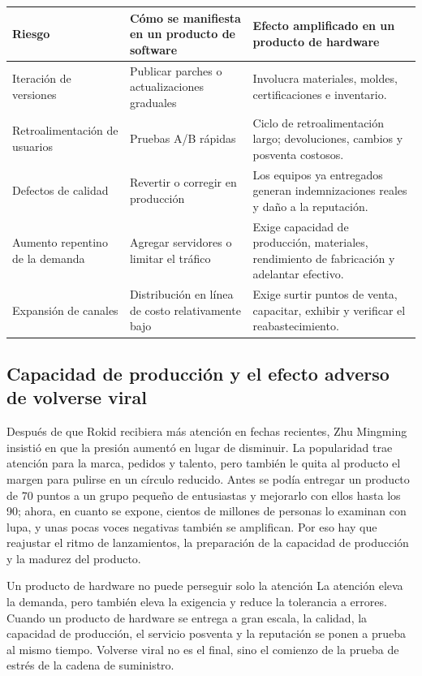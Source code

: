\documentclass[a4paper]{article}
\begin{document}
\noindent\begin{tabularx}{\textwidth}{p{}p{}X}
\toprule
Riesgo & Cómo se manifiesta en un producto de software & Efecto amplificado en un producto de hardware \\
\midrule
Iteración de versiones & Publicar parches o actualizaciones graduales & Involucra materiales, moldes, certificaciones e inventario. \\
Retroalimentación de usuarios & Pruebas A/B rápidas & Ciclo de retroalimentación largo; devoluciones, cambios y posventa costosos. \\
Defectos de calidad & Revertir o corregir en producción & Los equipos ya entregados generan indemnizaciones reales y daño a la reputación. \\
Aumento repentino de la demanda & Agregar servidores o limitar el tráfico & Exige capacidad de producción, materiales, rendimiento de fabricación y adelantar efectivo. \\
Expansión de canales & Distribución en línea de costo relativamente bajo & Exige surtir puntos de venta, capacitar, exhibir y verificar el reabastecimiento. \\
\bottomrule
\end{tabularx}

\subsection{Capacidad de producción y el efecto adverso de volverse viral}

Después de que Rokid recibiera más atención en fechas recientes, Zhu Mingming insistió en que la presión aumentó en lugar de disminuir. La popularidad trae atención para la marca, pedidos y talento, pero también le quita al producto el margen para pulirse en un círculo reducido. Antes se podía entregar un producto de 70 puntos a un grupo pequeño de entusiastas y mejorarlo con ellos hasta los 90; ahora, en cuanto se expone, cientos de millones de personas lo examinan con lupa, y unas pocas voces negativas también se amplifican. Por eso hay que reajustar el ritmo de lanzamientos, la preparación de la capacidad de producción y la madurez del producto.

\begin{importantbox}{Un producto de hardware no puede perseguir solo la atención}
La atención eleva la demanda, pero también eleva la exigencia y reduce la tolerancia a errores. Cuando un producto de hardware se entrega a gran escala, la calidad, la capacidad de producción, el servicio posventa y la reputación se ponen a prueba al mismo tiempo. Volverse viral no es el final, sino el comienzo de la prueba de estrés de la cadena de suministro.
\end{importantbox}
\end{document}
